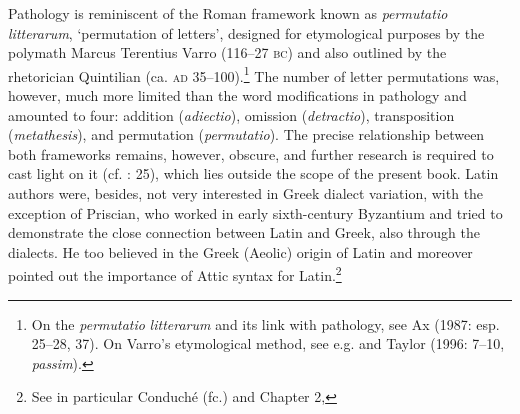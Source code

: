 \documentclass[output=paper]{langsci/langscibook}
\begin{document}
\begin{styleCatalogusnotities}
Pathology is reminiscent of the Roman framework known as \textit{permutatio} \textit{litterarum}, ‘permutation of letters’, designed for etymological purposes by the polymath Marcus Terentius Varro (116–27 \textsc{bc}) and also outlined by the rhetorician Quintilian (ca. \textsc{ad} 35–100).\footnote{ \textrm{On the} \textrm{\textit{permutatio} \textit{litterarum} }\textrm{and its link with pathology, see Ax (1987: esp. 25–28, 37). On Varro’s etymological method, see e.g. \citet{Pfaffel1981} and Taylor (1996: 7–10,} \textrm{\textit{passim}}).} The number of letter permutations was, however, much more limited than the word modifications in pathology and amounted to four: addition (\textit{adiectio}), omission (\textit{detractio}), transposition (\textit{metathesis}), and permutation (\textit{permutatio}). The precise relationship between both frameworks remains, however, obscure, and further research is required to cast light on it (cf. \citealt{Ax1987}: 25), which lies outside the scope of the present book. Latin authors were, besides, not very interested in Greek dialect variation, with the exception of Priscian, who worked in early sixth-century Byzantium and tried to demonstrate the close connection between Latin and Greek, also through the dialects. He too believed in the Greek (Aeolic) origin of Latin and moreover pointed out the importance of Attic syntax for Latin.\footnote{ \textrm{See in particular Conduché (fc.) and Chapter 2, }}
\end{styleCatalogusnotities}
\end{document}
